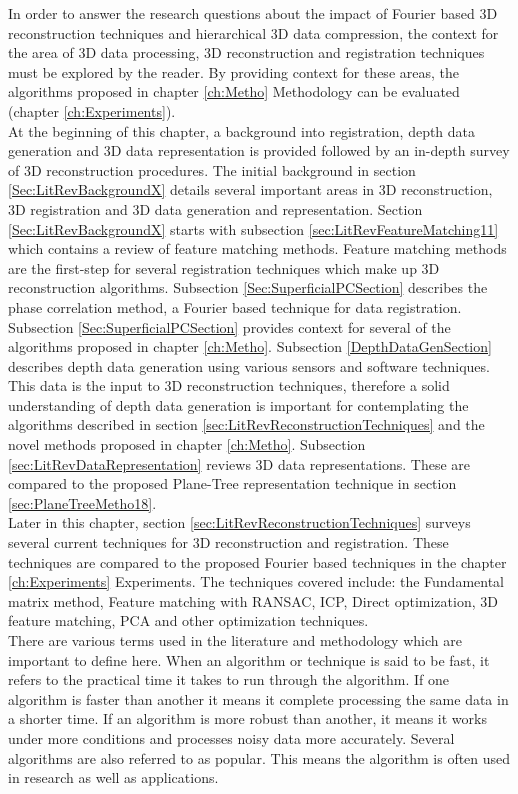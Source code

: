 
In order to answer the research questions about the impact of Fourier based 3D reconstruction techniques and hierarchical 3D data compression, the context for the area of 3D data processing, 3D reconstruction and registration techniques must be explored by the reader. By providing context for these areas, the algorithms proposed in chapter \ref{ch:Metho} Methodology can be evaluated (chapter \ref{ch:Experiments}). \\

At the beginning of this chapter, a background into registration, depth data generation and 3D data representation is provided followed by an in-depth survey of 3D reconstruction procedures. The initial background in section \ref{Sec:LitRevBackgroundX} details several important areas in 3D reconstruction, 3D registration and 3D data generation and representation. Section \ref{Sec:LitRevBackgroundX} starts with subsection \ref{sec:LitRevFeatureMatching11} which contains a review of feature matching methods. Feature matching methods are the first-step for several registration techniques which make up 3D reconstruction algorithms. Subsection \ref{Sec:SuperficialPCSection} describes the phase correlation method, a Fourier based technique for data registration. Subsection \ref{Sec:SuperficialPCSection} provides context for several of the algorithms proposed in chapter \ref{ch:Metho}. Subsection \ref{DepthDataGenSection} describes depth data generation using various sensors and software techniques. This data is the input to 3D reconstruction techniques, therefore a solid understanding of depth data generation is important for contemplating the algorithms described in section \ref{sec:LitRevReconstructionTechniques} and the novel methods proposed in chapter \ref{ch:Metho}. Subsection \ref{sec:LitRevDataRepresentation} reviews 3D data representations. These are compared to the proposed Plane-Tree representation technique in section \ref{sec:PlaneTreeMetho18}. \\

Later in this chapter, section \ref{sec:LitRevReconstructionTechniques} surveys several current techniques for 3D reconstruction and registration. These techniques are compared to the proposed Fourier based techniques in the chapter \ref{ch:Experiments} Experiments. The techniques covered include: the Fundamental matrix method, Feature matching with RANSAC, ICP, Direct optimization, 3D feature matching, PCA and other optimization techniques. \\

There are various terms used in the literature and methodology which are important to define here. When an algorithm or technique is said to be fast, it refers to the practical time it takes to run through the algorithm. If one algorithm is faster than another it means it complete processing the same data in a shorter time. If an algorithm is more robust than another, it means it works under more conditions and processes noisy data more accurately. Several algorithms are also referred to as popular. This means the algorithm is often used in research as well as applications. \\


